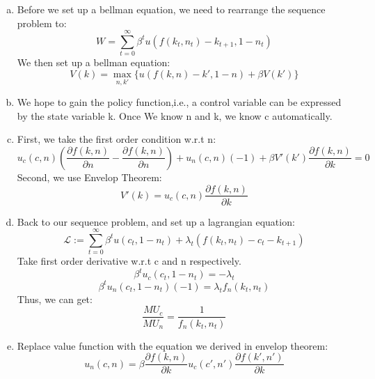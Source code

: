 \documentclass[11pt]{article} %
\begin{document}
\begin{enumerate}[a.]
	\item Before we set up a bellman equation, we need to rearrange the sequence problem to:
	 \begin{equation*}
		 W=\sum_{t=0}^\infty \beta^t u(f(k_t,n_t)-k_{t+1},1-n_t)
	 \end{equation*}
	 We then set up a bellman equation:
	 \begin{equation*}
		 V(k)=\max_{n,k'}\{u(f(k,n)-k',1-n)+\beta V(k')\}
	 \end{equation*}
	\item We hope to gain the policy function,i.e., a control variable can be expressed by the state variable k. Once We
	 		know n and k, we know c automatically. 
	\item First, we take the first order condition w.r.t n:
	 \begin{equation*}
		 u_c(c,n)(\frac{\partial f(k,n)}{\partial n}-\frac{\partial f(k,n)}{\partial n})+u_n(c,n)(-1)+\beta V'(k')\frac{\partial f(k,n)}{\partial k}=0
	 \end{equation*}
	 Second, we use Envelop Theorem:
	 \begin{equation*}
		 V'(k)=u_c(c,n)\frac{\partial f(k,n)}{\partial k}
	 \end{equation*}
	\item Back to our sequence problem, and set up a lagrangian equation:
	 	\begin{equation*}
			 \mathcal{L}:=\sum_{t=0}^\infty \beta^t u(c_t,1-n_t)+\lambda_t(f(k_t,n_t)-c_t-k_{t+1})
		 \end{equation*}
		 Take first order derivative w.r.t c and n respectively.
		 \begin{equation*}
			 \beta^tu_c(c_t,1-n_t)=-\lambda_t
		 \end{equation*}
		 \begin{equation*}
			 \beta^tu_n(c_t,1-n_t)(-1)=\lambda_t f_n(k_t,n_t)
		 \end{equation*}
		 Thus, we can get:
		 \begin{equation*}
			\frac{MU_c}{MU_n}=\frac{1}{f_n(k_t,n_t)} 
		 \end{equation*}
	\item Replace value function with the equation we derived in envelop theorem:
		 \begin{equation*}
			 u_n(c,n)=\beta\frac{\partial f(k,n)}{\partial k}u_c(c',n')\frac{\partial  f(k',n')}{\partial k}
		 \end{equation*}
\end{enumerate}
\end{document}
